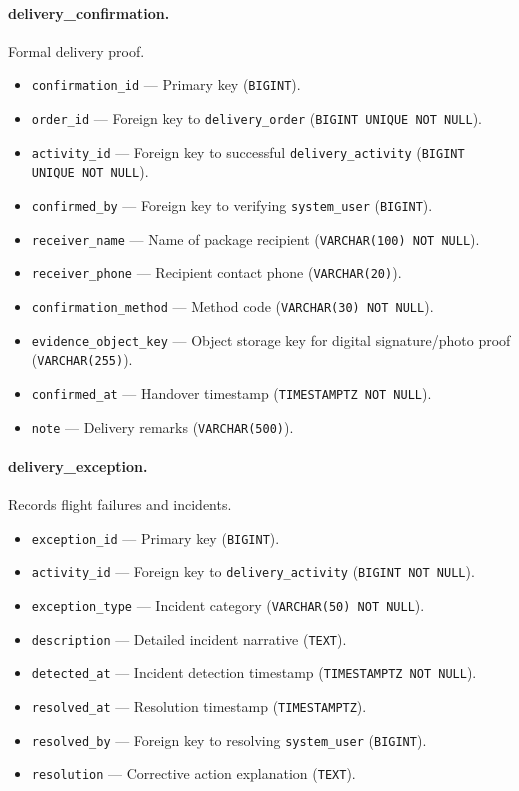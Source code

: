 \paragraph{delivery\_confirmation.}
Formal delivery proof.
\begin{itemize}
    \item \texttt{confirmation\_id} — Primary key (\texttt{BIGINT}).
    \item \texttt{order\_id} — Foreign key to \texttt{delivery\_order} (\texttt{BIGINT UNIQUE NOT NULL}).
    \item \texttt{activity\_id} — Foreign key to successful \texttt{delivery\_activity} (\texttt{BIGINT UNIQUE NOT NULL}).
    \item \texttt{confirmed\_by} — Foreign key to verifying \texttt{system\_user} (\texttt{BIGINT}).
    \item \texttt{receiver\_name} — Name of package recipient (\texttt{VARCHAR(100) NOT NULL}).
    \item \texttt{receiver\_phone} — Recipient contact phone (\texttt{VARCHAR(20)}).
    \item \texttt{confirmation\_method} — Method code (\texttt{VARCHAR(30) NOT NULL}).
    \item \texttt{evidence\_object\_key} — Object storage key for digital signature/photo proof (\texttt{VARCHAR(255)}).
    \item \texttt{confirmed\_at} — Handover timestamp (\texttt{TIMESTAMPTZ NOT NULL}).
    \item \texttt{note} — Delivery remarks (\texttt{VARCHAR(500)}).
\end{itemize}

\paragraph{delivery\_exception.}
Records flight failures and incidents.
\begin{itemize}
    \item \texttt{exception\_id} — Primary key (\texttt{BIGINT}).
    \item \texttt{activity\_id} — Foreign key to \texttt{delivery\_activity} (\texttt{BIGINT NOT NULL}).
    \item \texttt{exception\_type} — Incident category (\texttt{VARCHAR(50) NOT NULL}).
    \item \texttt{description} — Detailed incident narrative (\texttt{TEXT}).
    \item \texttt{detected\_at} — Incident detection timestamp (\texttt{TIMESTAMPTZ NOT NULL}).
    \item \texttt{resolved\_at} — Resolution timestamp (\texttt{TIMESTAMPTZ}).
    \item \texttt{resolved\_by} — Foreign key to resolving \texttt{system\_user} (\texttt{BIGINT}).
    \item \texttt{resolution} — Corrective action explanation (\texttt{TEXT}).
\end{itemize}

